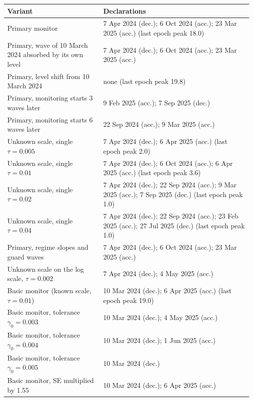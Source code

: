 \begin{tabular}{lp{8.6cm}}
\toprule
Variant & Declarations \\
\midrule
Primary monitor & 7 Apr 2024 (dec.); 6 Oct 2024 (acc.); 23 Mar 2025 (acc.) (last epoch peak 18.0) \\
Primary, wave of 10 March 2024 absorbed by its own level & 7 Apr 2024 (dec.); 6 Oct 2024 (acc.); 23 Mar 2025 (acc.) \\
Primary, level shift from 10 March 2024 & none (last epoch peak 19.8) \\
Primary, monitoring starts 3 waves later & 9 Feb 2025 (acc.); 7 Sep 2025 (dec.) \\
Primary, monitoring starts 6 waves later & 22 Sep 2024 (acc.); 9 Mar 2025 (acc.) \\
Unknown scale, single $\tau = 0.005$ & 7 Apr 2024 (dec.); 6 Apr 2025 (acc.) (last epoch peak 2.0) \\
Unknown scale, single $\tau = 0.01$ & 7 Apr 2024 (dec.); 6 Oct 2024 (acc.); 6 Apr 2025 (acc.) (last epoch peak 3.6) \\
Unknown scale, single $\tau = 0.02$ & 7 Apr 2024 (dec.); 22 Sep 2024 (acc.); 9 Mar 2025 (acc.); 7 Sep 2025 (dec.) (last epoch peak 1.0) \\
Unknown scale, single $\tau = 0.04$ & 7 Apr 2024 (dec.); 22 Sep 2024 (acc.); 23 Feb 2025 (acc.); 27 Jul 2025 (dec.) (last epoch peak 1.0) \\
Primary, regime slopes and guard waves & 7 Apr 2024 (dec.); 6 Oct 2024 (acc.); 23 Mar 2025 (acc.) \\
Unknown scale on the log scale, $\tau = 0.002$ & 7 Apr 2024 (dec.); 4 May 2025 (acc.) \\
Basic monitor (known scale, $\tau = 0.01$) & 10 Mar 2024 (dec.); 6 Apr 2025 (acc.) (last epoch peak 19.0) \\
Basic monitor, tolerance $\gamma_0 = 0.003$ & 10 Mar 2024 (dec.); 4 May 2025 (acc.) \\
Basic monitor, tolerance $\gamma_0 = 0.004$ & 10 Mar 2024 (dec.); 1 Jun 2025 (acc.) \\
Basic monitor, tolerance $\gamma_0 = 0.005$ & 10 Mar 2024 (dec.) \\
Basic monitor, SE multiplied by 1.55 & 10 Mar 2024 (dec.); 6 Apr 2025 (acc.) \\
\bottomrule
\end{tabular}
